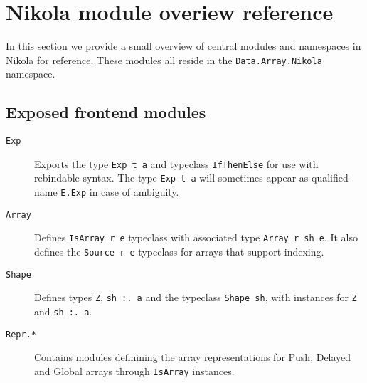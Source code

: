 \section{Nikola module overiew reference} \label{section:nikola-reference}

In this section we provide a small overview of central modules and namespaces
in Nikola for reference. These modules all reside in the
\lstinline{Data.Array.Nikola} namespace.

\subsection{Exposed frontend modules}
\begin{description}

\item[\texttt{Exp}] Exports the type \lstinline{Exp t a} and typeclass
  \lstinline{IfThenElse} for use with rebindable syntax. The type
  \lstinline{Exp t a} will sometimes appear as qualified name
  \lstinline{E.Exp} in case of ambiguity.

  \item[\texttt{Array}] Defines \lstinline{IsArray r e} typeclass with
    associated type \lstinline{Array r sh e}. It also defines the
    \lstinline{Source r e} typeclass for arrays that support indexing.

  \item[\texttt{Shape}] Defines types \lstinline{Z}, \lstinline{sh :. a}
    and the typeclass \lstinline{Shape sh}, with instances for \lstinline{Z} and
    \lstinline{sh :. a}.

  \item[\texttt{Repr.*}] Contains modules definining the array
    representations for Push, Delayed and Global arrays through
    \lstinline{IsArray} instances.

\end{description}

